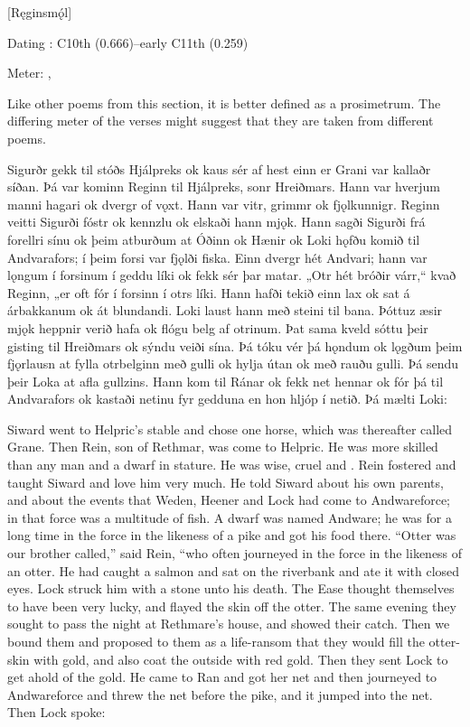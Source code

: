 [Ręginsmǫ́l]

\begin{flushright}%
Dating \parencite{Sapp2022}: C10th (0.666)–early C11th (0.259)

Meter: \Ljodahattr, \Fornyrdislag%
\end{flushright}

Like other poems from this section, it is better defined as a prosimetrum. The differing meter of the verses might suggest that they are taken from different poems.

\sectionline

\bpg\bpa Sigurðr gekk til stóðs Hjálpreks ok kaus sér af hest einn er Grani var kallaðr síðan. Þá var kominn Reginn til Hjálpreks, sonr Hreiðmars. Hann var hverjum manni hagari ok dvergr of vǫxt. Hann var vitr, grimmr ok fjǫlkunnigr. Reginn veitti Sigurði fóstr ok kennzlu ok elskaði hann mjǫk. Hann sagði Sigurði frá forellri sínu ok þeim atburðum at Óðinn ok Hænir ok Loki hǫfðu komið til Andvarafors; í þeim forsi var fjǫlði fiska. Einn dvergr hét Andvari; hann var lǫngum í forsinum í geddu líki ok fekk sér þar matar. „Otr hét bróðir várr,“ kvað Reginn, „er oft fór í forsinn í otrs líki. Hann hafði tekið einn lax ok sat á árbakkanum ok át blundandi. Loki laust hann með steini til bana. Þóttuz æsir mjǫk heppnir verið hafa ok flógu belg af otrinum. Þat sama kveld sóttu þeir gisting til Hreiðmars ok sýndu veiði sína. Þá tóku vér þá hǫndum ok lǫgðum þeim fjǫrlausn at fylla otrbelginn með gulli ok hylja útan ok með rauðu gulli. Þá sendu þeir Loka at afla gullzins. Hann kom til Ránar ok fekk net hennar ok fór þá til Andvarafors ok kastaði netinu fyr gedduna en hon hljóp í netið. Þá mælti Loki:\epa

\bpb Siward went to Helpric’s stable and chose one horse, which was thereafter called Grane. Then Rein, son of Rethmar, was come to Helpric. He was more skilled than any man and a dwarf in stature. He was wise, cruel and . Rein fostered and taught Siward and love him very much. He told Siward about his own parents, and about the events that Weden, Heener and Lock had come to Andwareforce; in that force was a multitude of fish. A dwarf was named Andware; he was for a long time in the force in the likeness of a pike and got his food there. “Otter was our brother called,” said Rein, “who often journeyed in the force in the likeness of an otter. He had caught a salmon and sat on the riverbank and ate it with closed eyes. Lock struck him with a stone unto his death. The Ease thought themselves to have been very lucky, and flayed the skin off the otter. The same evening they sought to pass the night at Rethmare’s house, and showed their catch. Then we bound them and proposed to them as a life-ransom that they would fill the otter-skin with gold, and also coat the outside with red gold. Then they sent Lock to get ahold of the gold. He came to Ran and got her net and then journeyed to Andwareforce and threw the net before the pike, and it jumped into the net. Then Lock spoke:\epb\epg


